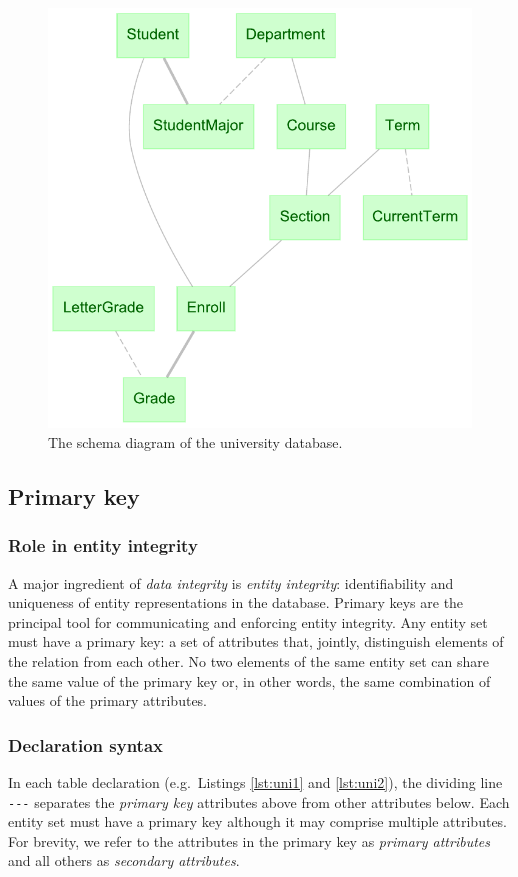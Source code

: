 \documentclass[letter,10pt]{article}
\begin{document}
\begin{figure}
\includegraphics[width=\columnwidth]{uni_erd.pdf}
\caption{The schema diagram of the university database.}
\label{fig:erd}
\end{figure}


\subsection{Primary key}
\subsubsection{Role in entity integrity}
A major ingredient of \emph{data integrity} is \emph{entity integrity}: identifiability and uniqueness of entity representations in the database. 
{Primary keys} are the principal tool for communicating and enforcing entity integrity. 
Any entity set must have a primary key: a set of attributes that, jointly, distinguish elements of the relation from each other.
No two elements of the same entity set can share the same value of the primary key or, in other words, the same combination of values of the primary attributes.

\subsubsection{Declaration syntax}
In each table declaration (e.g.\ Listings \ref{lst:uni1} and \ref{lst:uni2}), the dividing line \lstinline$---$ separates the \emph{primary key} attributes above from other attributes below.  
Each entity set must have a primary key although it may comprise multiple attributes. 
For brevity, we refer to the attributes in the primary key as \emph{primary attributes} and all others as \emph{secondary attributes}.
\end{document}
